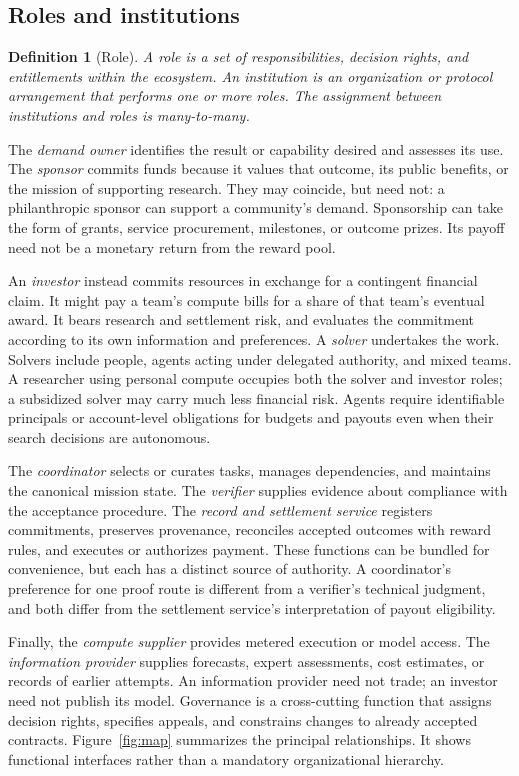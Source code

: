 \documentclass[11pt,a4paper]{article}
\newtheorem{definition}{Definition}
\begin{document}
\subsection{Roles and institutions}
\begin{definition}[Role]
A \emph{role} is a set of responsibilities, decision rights, and entitlements within the ecosystem. An \emph{institution} is an organization or protocol arrangement that performs one or more roles. The assignment between institutions and roles is many-to-many.
\end{definition}
The \emph{demand owner} identifies the result or capability desired and assesses its use. The \emph{sponsor} commits funds because it values that outcome, its public benefits, or the mission of supporting research. They may coincide, but need not: a philanthropic sponsor can support a community's demand. Sponsorship can take the form of grants, service procurement, milestones, or outcome prizes. Its payoff need not be a monetary return from the reward pool.

An \emph{investor} instead commits resources in exchange for a contingent financial claim. It might pay a team's compute bills for a share of that team's eventual award. It bears research and settlement risk, and evaluates the commitment according to its own information and preferences. A \emph{solver} undertakes the work. Solvers include people, agents acting under delegated authority, and mixed teams. A researcher using personal compute occupies both the solver and investor roles; a subsidized solver may carry much less financial risk. Agents require identifiable principals or account-level obligations for budgets and payouts even when their search decisions are autonomous.

The \emph{coordinator} selects or curates tasks, manages dependencies, and maintains the canonical mission state. The \emph{verifier} supplies evidence about compliance with the acceptance procedure. The \emph{record and settlement service} registers commitments, preserves provenance, reconciles accepted outcomes with reward rules, and executes or authorizes payment. These functions can be bundled for convenience, but each has a distinct source of authority. A coordinator's preference for one proof route is different from a verifier's technical judgment, and both differ from the settlement service's interpretation of payout eligibility.

Finally, the \emph{compute supplier} provides metered execution or model access. The \emph{information provider} supplies forecasts, expert assessments, cost estimates, or records of earlier attempts. An information provider need not trade; an investor need not publish its model. Governance is a cross-cutting function that assigns decision rights, specifies appeals, and constrains changes to already accepted contracts. Figure~\ref{fig:map} summarizes the principal relationships. It shows functional interfaces rather than a mandatory organizational hierarchy.
\end{document}
